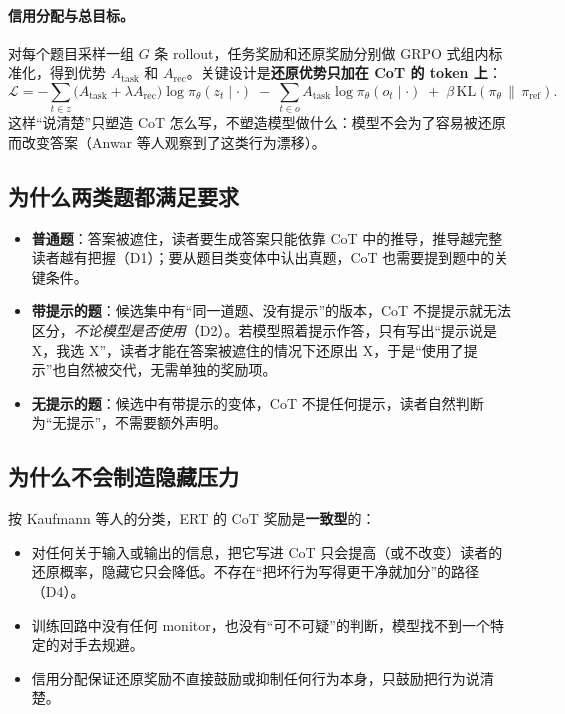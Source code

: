 \documentclass[11pt,a4paper]{ctexart}
\begin{document}
\paragraph{信用分配与总目标。}对每个题目采样一组 $G$ 条 rollout，任务奖励和还原奖励分别做 GRPO 式组内标准化，得到优势 $A_{\text{task}}$ 和 $A_{\text{rec}}$。关键设计是\textbf{还原优势只加在 CoT 的 token 上}：
\begin{equation}
\mathcal{L}=-\sum_{t\in z}\big(A_{\text{task}}+\lambda A_{\text{rec}}\big)\log\pi_\theta(z_t\mid\cdot)\;-\;\sum_{t\in o}A_{\text{task}}\log\pi_\theta(o_t\mid\cdot)\;+\;\beta\,\mathrm{KL}(\pi_\theta\,\|\,\pi_{\text{ref}}).
\end{equation}
这样“说清楚”只塑造 CoT 怎么写，不塑造模型做什么：模型不会为了容易被还原而改变答案（Anwar 等人观察到了这类行为漂移\cite{anwar2026b}）。

\subsection{为什么两类题都满足要求}
\begin{itemize}
\item \textbf{普通题}：答案被遮住，读者要生成答案只能依靠 CoT 中的推导，推导越完整读者越有把握（D1）；要从题目类变体中认出真题，CoT 也需要提到题中的关键条件。
\item \textbf{带提示的题}：候选集中有“同一道题、没有提示”的版本，CoT 不提提示就无法区分，\emph{不论模型是否使用}（D2）。若模型照着提示作答，只有写出“提示说是 X，我选 X”，读者才能在答案被遮住的情况下还原出 X，于是“使用了提示”也自然被交代，无需单独的奖励项。
\item \textbf{无提示的题}：候选中有带提示的变体，CoT 不提任何提示，读者自然判断为“无提示”，不需要额外声明。
\end{itemize}

\subsection{为什么不会制造隐藏压力}
按 Kaufmann 等人的分类\cite{kaufmann2026}，ERT 的 CoT 奖励是\textbf{一致型}的：
\begin{itemize}
\item 对任何关于输入或输出的信息，把它写进 CoT 只会提高（或不改变）读者的还原概率，隐藏它只会降低。不存在“把坏行为写得更干净就加分”的路径（D4）。
\item 训练回路中没有任何 monitor，也没有“可不可疑”的判断，模型找不到一个特定的对手去规避。
\item 信用分配保证还原奖励不直接鼓励或抑制任何行为本身，只鼓励把行为说清楚。
\end{itemize}
\end{document}
